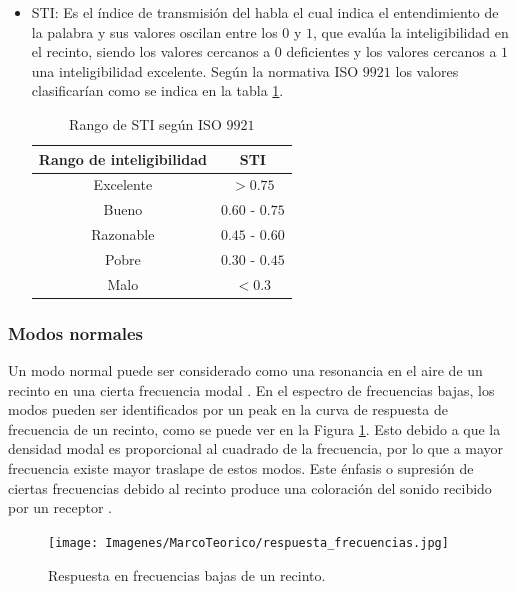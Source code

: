 \begin{itemize}
    
    \item STI: Es el índice de transmisión del habla el cual indica el entendimiento de la palabra y sus valores oscilan entre los $0$ y $1$, que evalúa la inteligibilidad en el recinto, siendo los valores cercanos a 0 deficientes y los valores cercanos a $1$ una inteligibilidad excelente. Según la normativa ISO $9921$ \cite{ISO9921} los valores clasificarían como se indica en la tabla \ref{tab: rango STI}. 

\begin{table}[H]
    \centering
    \caption{Rango de STI según ISO $9921$}
    \label{tab: rango STI}
    \begin{tabular}{|c|c|}
    \hline
    \textbf{Rango de inteligibilidad} & \textbf{STI} \\ \hline
    Excelente                &     $>0.75$     \\ \hline
    Bueno                    & $0.60$ - $0.75$ \\ \hline
    Razonable                & $0.45$ - $0.60$ \\ \hline
    Pobre                    & $0.30$ - $0.45$ \\ \hline
    Malo                     & $<0.3$ \\ \hline
    \end{tabular}
\end{table}
\end{itemize}

\subsubsection{Modos normales}
Un modo normal puede ser considerado como una resonancia en el aire de un recinto en una cierta frecuencia modal \cite{Kleiner2014-fd}.
En el espectro de frecuencias bajas, los modos pueden ser identificados por un peak en la curva de respuesta de frecuencia de un recinto, como se puede ver en la Figura \ref{fig: respuesta frecuencia}. 
Esto debido a que la densidad modal es proporcional al cuadrado de la frecuencia, por lo que a mayor frecuencia existe mayor traslape de estos modos.
Este énfasis o supresión de ciertas frecuencias debido al recinto produce una coloración del sonido recibido por un receptor \cite{Kuttruff_2017}.

\begin{figure}[H]
    \centering
    \texttt{[image: Imagenes/MarcoTeorico/respuesta\_frecuencias.jpg]}
    \caption{Respuesta en frecuencias bajas de un recinto.}
    \label{fig: respuesta frecuencia}
\end{figure}

